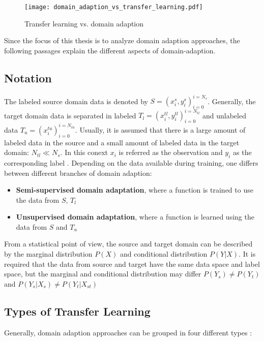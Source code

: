 \begin{figure}[H]
  \centering
  \texttt{[image: domain\_adaption\_vs\_transfer\_learning.pdf]}
  \caption {Transfer learning vs. domain adaption} \label{fig:domain_adaption_vs_transfer_learning}
\end{figure}


Since the focus of this thesis is to analyze domain adaption approaches, the following passages explain the different aspects of domain-adaption.
\subsection{Notation}
The labeled source domain data is denoted by  $S = {(x_{i}^{s}, y_{i}^{s})_{i = 0}^{i = N_{s}}}$. Generally, the target domain data is separated in labeled $T_{l} = {(x_{i}^{tl}, y_{i}^{tl})_{i = 0}^{i = N_{tl}}}$ and unlabeled data $T_{u} = {(x_{i}^{tu})_{i = 0}^{i = N_{tu}}}$. Usually, it is assumed that there is a large amount of labeled data in the source and a small amount of labeled data in the target domain: $N_{tl} \ll N_{s}$. In this conext $x_{i}$ is referred as the observation and $y_{i}$ as the corresponding label  \cite{Patel2015}. Depending on the data available during training, one differs between different branches of domain adaption: 
\begin{itemize}
\item \textbf{Semi-supervised domain adaptation}, where a function is trained to use the data from $S$, $T_{l}$
\item \textbf{Unsupervised domain adaptation}, where a function is learned using the data from $S$ and $T_{u}$ \cite{Patel2015} 
\end{itemize}

From a statistical point of view, the source and target domain can be described by the marginal distribution $P(X)$ and conditional distribution $P(Y|X)$. It is required that the data from source and target have the same data space and label space, but the marginal and conditional distribution may differ $P(Y_{s}) \neq P(Y_{t})$ and $P(Y_{s}|X_{s}) \neq P(Y_{t}|X_{st})$ \cite{Qikang2020}

\subsection{Types of Transfer Learning}
Generally, domain adaption approaches can be grouped in four different types \cite{AZAMFAR2020103932}:  

